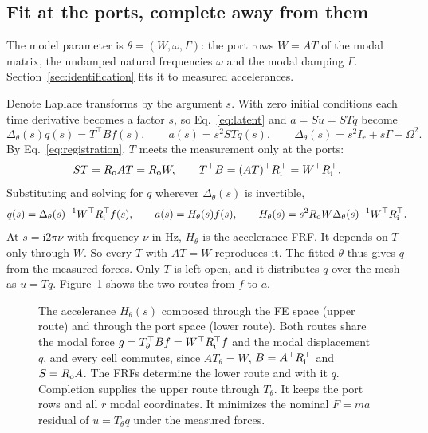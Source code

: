 \subsection{Fit at the ports, complete away from them}
The model parameter is $\theta=(W,\omega,\Gamma)$: the port rows $W=AT$ of
the modal matrix, the undamped natural frequencies $\omega$ and the modal
damping $\Gamma$. Section~\ref{sec:identification} fits it to measured
accelerances.

Denote Laplace transforms by the argument $s$. With zero initial conditions
each time derivative becomes a factor $s$, so Eq.~\eqref{eq:latent} and
$a=S\ddot u=ST\ddot q$ become
\begin{equation}
 \Delta_\theta(s)q(s)=T^{\top}Bf(s),\qquad a(s)=s^2STq(s),\qquad
 \Delta_\theta(s)=s^2I_r+s\Gamma+\Omega^2.
 \label{eq:laplace}
\end{equation}
By Eq.~\eqref{eq:registration}, $T$ meets the measurement only at the ports:
\begin{equation}
 ST=R_{\rm o}AT=R_{\rm o}W,\qquad
 T^{\top}B=(AT)^{\top}R_{\rm i}^{\top}=W^{\top}R_{\rm i}^{\top}.
 \label{eq:ports-see}
\end{equation}
Substituting and solving for $q$ wherever $\Delta_\theta(s)$ is invertible,
\begin{equation}
 q(s)=\Delta_\theta(s)^{-1}W^{\top}R_{\rm i}^{\top}f(s),\qquad
 a(s)=H_\theta(s)f(s),\qquad
 H_\theta(s)=s^2R_{\rm o}W\Delta_\theta(s)^{-1}W^{\top}R_{\rm i}^{\top}.
 \label{eq:model}
\end{equation}
At $s=\mathrm i2\pi\nu$ with frequency $\nu$ in Hz, $H_\theta$ is the
accelerance FRF. It depends on $T$ only through $W$. So every $T$ with
$AT=W$ reproduces it. The fitted $\theta$ thus gives $q$ from the measured
forces. Only $T$ is left open, and it distributes $q$ over the mesh as
$u=Tq$. Figure~\ref{fig:spaces} shows the two routes from $f$ to $a$.

\begin{figure}[tb]\centering

\caption{The accelerance $H_\theta(s)$ composed through the FE space (upper
route) and through the port space (lower route). Both routes share the modal
force $g=T_\theta^{\top}Bf=W^{\top}R_{\rm i}^{\top}f$ and the modal
displacement $q$, and every cell commutes, since $AT_\theta=W$,
$B=A^{\top}R_{\rm i}^{\top}$ and $S=R_{\rm o}A$. The FRFs determine the lower
route and with it $q$. Completion supplies the upper route through
$T_\theta$. It keeps the port rows and all $r$ modal coordinates. It minimizes the
nominal $F=ma$ residual of $u=T_\theta q$ under the measured forces.}
\label{fig:spaces}
\end{figure}

